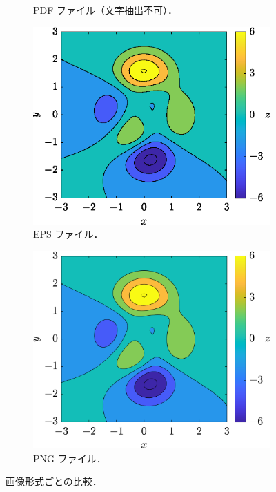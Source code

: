 \begin{figure}[tp]
\begin{subfigure}{0.45\columnwidth}
        \caption{PDF ファイル（文字抽出不可）．}
        \label{subfig:figcomp1_pdf2}
    \end{subfigure}

    \vspace{5mm} %
    \begin{subfigure}{0.45\columnwidth}
        \centering
        \includegraphics[width=\columnwidth]{figure/comparison1-3.eps}
        \caption{EPS ファイル．}
        \label{subfig:figcomp1_eps}
    \end{subfigure}
    \hfill %
    \begin{subfigure}{0.45\columnwidth}
        \centering
        \includegraphics[width=\columnwidth]{figure/comparison1-4.png}
        \caption{PNG ファイル．}
        \label{subfig:figcomp1_png}
    \end{subfigure}
    \caption{画像形式ごとの比較．}
    \label{fig:figure_comparison1}
\end{figure}

